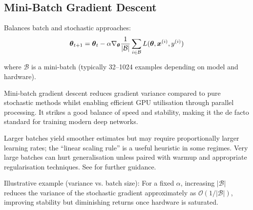 \subsection{Mini-Batch Gradient Descent}

Balances batch and stochastic approaches:
\begin{equation}
\boldsymbol{\theta}_{t+1} = \boldsymbol{\theta}_t - \alpha \nabla_{\boldsymbol{\theta}} \frac{1}{|\mathcal{B}|} \sum_{i \in \mathcal{B}} L(\boldsymbol{\theta}, \boldsymbol{x}^{(i)}, y^{(i)})
\end{equation}

where $\mathcal{B}$ is a mini-batch (typically 32–1024 examples depending on model and hardware).

Mini-batch gradient descent reduces gradient variance compared to pure stochastic methods whilst enabling efficient GPU utilisation through parallel processing. It strikes a good balance of speed and stability, making it the de facto standard for training modern deep networks.

Larger batches yield smoother estimates but may require proportionally larger learning rates; the ``linear scaling rule'' is a useful heuristic in some regimes. Very large batches can hurt generalisation unless paired with warmup and appropriate regularisation techniques. See \cite{WebOptimizationDLBook,D2LChapterOptimization} for further guidance.

Illustrative example (variance vs. batch size): For a fixed \(\alpha\), increasing \(|\mathcal{B}|\) reduces the variance of the stochastic gradient approximately as \(\mathcal{O}(1/|\mathcal{B}|)\), improving stability but diminishing returns once hardware is saturated.


